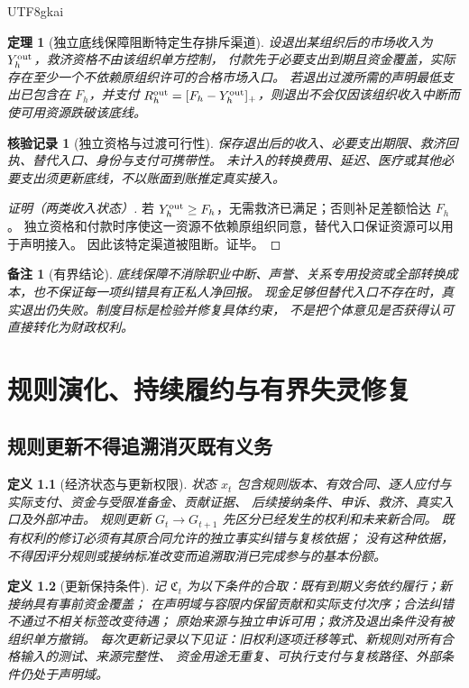 \documentclass[12pt,a4paper,openany]{report}
\newtheorem{definition}{定义}[chapter]
\newtheorem{theorem}{定理}[chapter]
\newtheorem{remark}{备注}[chapter]
\newtheorem{Certificate}{核验记录}[chapter]
\newcommand{\Core}{\mathfrak C}
\begin{document}
\begin{CJK*}{UTF8}{gkai}
\begin{theorem}[独立底线保障阻断特定生存排斥渠道]
\label{thm:exit}
设退出某组织后的市场收入为 $Y_h^{\rm out}$，救济资格不由该组织单方控制，
付款先于必要支出到期且资金覆盖，实际存在至少一个不依赖原组织许可的合格市场入口。
若退出过渡所需的声明最低支出已包含在 $F_h$，并支付
$R_h^{\rm out}=[F_h-Y_h^{\rm out}]_+$，则退出不会仅因该组织收入中断而使可用资源跌破该底线。
\end{theorem}
\begin{Certificate}[独立资格与过渡可行性]
保存退出后的收入、必要支出期限、救济回执、替代入口、身份与支付可携带性。
未计入的转换费用、延迟、医疗或其他必要支出须更新底线，不以账面到账推定真实接入。
\end{Certificate}
\begin{proof}[证明（两类收入状态）]
若 $Y_h^{\rm out}\ge F_h$，无需救济已满足；否则补足差额恰达 $F_h$。
独立资格和付款时序使这一资源不依赖原组织同意，替代入口保证资源可以用于声明接入。
因此该特定渠道被阻断。证毕。
\end{proof}

\begin{remark}[有界结论]
底线保障不消除职业中断、声誉、关系专用投资或全部转换成本，也不保证每一项纠错具有正私人净回报。
现金足够但替代入口不存在时，真实退出仍失败。制度目标是检验并修复具体约束，
不是把个体意见是否获得认可直接转化为财政权利。
\end{remark}

\chapter{规则演化、持续履约与有界失灵修复}
\label{chap:dynamics}

\section{规则更新不得追溯消灭既有义务}

\begin{definition}[经济状态与更新权限]
\label{def:update-state}
状态 $x_t$ 包含规则版本、有效合同、逐人应付与实际支付、资金与受限准备金、贡献证据、
后续接纳条件、申诉、救济、真实入口及外部冲击。
规则更新 $G_t\to G_{t+1}$ 先区分已经发生的权利和未来新合同。
既有权利的修订必须有其原合同允许的独立事实纠错与复核依据；
没有这种依据，不得因评分规则或接纳标准改变而追溯取消已完成参与的基本份额。
\end{definition}

\begin{definition}[更新保持条件]
\label{def:update-invariants}
记 $\Core_t$ 为以下条件的合取：既有到期义务依约履行；新接纳具有事前资金覆盖；
在声明域与容限内保留贡献和实际支付次序；合法纠错不通过不相关标签改变待遇；
原始来源与独立申诉可用；救济及退出条件没有被组织单方撤销。
每次更新记录以下见证：旧权利逐项迁移等式、新规则对所有合格输入的测试、来源完整性、
资金用途无重复、可执行支付与复核路径、外部条件仍处于声明域。
\end{definition}


\end{CJK*}
\end{document}
